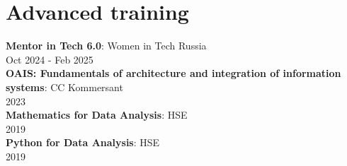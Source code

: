 \documentclass[letterpaper,11pt,english,russian]{article}
\begin{document}
\section{Advanced training}
 \begin{itemize}[leftmargin=0.15in, label={}]
    \small{\item{
     \textbf{Mentor in Tech 6.0}{: Women in Tech Russia\\ Oct 2024 - Feb 2025} \\
     \textbf{OAIS: Fundamentals of architecture and integration of information systems}{: CC Kommersant\\ 2023} \\
     \textbf{Mathematics for Data Analysis}{: HSE\\ 2019} \\
     \textbf{Python for Data Analysis}{: HSE\\ 2019}
    }}
 \end{itemize}


\end{document}
